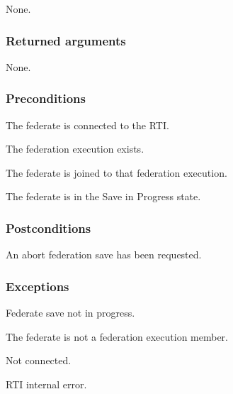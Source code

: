\begin{stdalphalist}
    \item None.
\end{stdalphalist}

\subsubsection{Returned arguments}

\begin{stdalphalist}
    \item None.
\end{stdalphalist}

\subsubsection{Preconditions}

\begin{stdalphalist}
    \item The federate is connected to the RTI.
    \item The federation execution exists.
    \item The federate is joined to that federation execution.
    \item The federate is in the Save in Progress state.
\end{stdalphalist}

\subsubsection{Postconditions}

\begin{stdalphalist}
    \item An abort federation save has been requested.
\end{stdalphalist}

\subsubsection{Exceptions}

\begin{stdalphalist}
    \item Federate save not in progress.
    \item The federate is not a federation execution member.
    \item Not connected.
    \item RTI internal error.
\end{stdalphalist}

